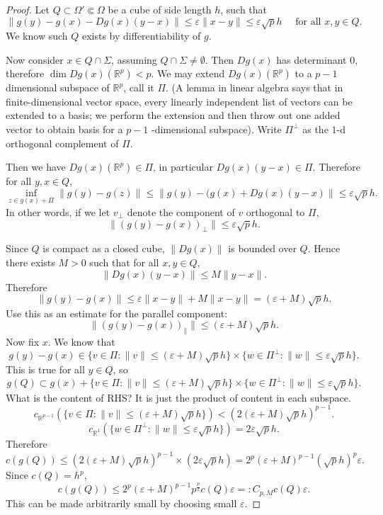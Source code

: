 \begin{proof}
	Let $Q \subset \Omega' \Subset \Omega$ be a cube of side length $h$, such that
	\[
		\|g(y) - g(x) - D g(x) (y - x)\| \le  \varepsilon \|x - y\| \le \varepsilon \sqrt{p}  h \quad \text{ for all } x, y \in Q
	.\]
	We know such $Q $ exists by differentiability of $g$.

	Now consider $x \in Q \cap \Sigma$, assuming $Q \cap \Sigma \neq \emptyset $. Then $Dg\left( x \right) $ has determinant $0$, therefore $\operatorname{dim} Dg(x)(\mathbb{R}^p) < p$. We may extend $Dg(x) (\mathbb{R}^p)$ to a $p - 1$ dimensional subspace of $\mathbb{R}^p$, call it $\Pi$. (A lemma in linear algebra says that in finite-dimensional vector space, every linearly independent list of vectors can be extended to a basis; we perform the extension and then throw out one added vector to obtain basis for a $p-1$ -dimensional subspace). Write $\Pi^\perp$ as the $1$-d orthogonal complement of $\Pi$.
	
	Then we have $Dg(x) (\mathbb{R}^p) \in \Pi$, in particular $Dg(x) (y - x) \in \Pi$. Therefore for all $y,x \in Q$,
	\[
		\inf_{z \in g(x) + \Pi}\|g(y) - g(z) \|
		\le \|g(y) - (g(x) + Dg(x) (y-x)\|
		\le \varepsilon \sqrt{p}  h
	.\] 
	In other words, if we let $v_\perp$ denote the component of $v$ orthogonal to $\Pi$,
	\[
	\|(g(y) - g(x))_\perp\| \le  \varepsilon \sqrt{p}  h
	.\] 

	Since $Q$ is compact as a closed cube, $\|Dg(x)\|$ is bounded over $Q$. Hence there exists $M>0$ such that for all $x, y \in Q$, 
	\[
		\|Dg(x)(y-x)\|\le M \| y - x\|
	.\] 
	Therefore
	\[
		\|g(y) - g(x)\| \le \varepsilon \| x - y\| + M \| x - y\| = (\varepsilon + M) \sqrt{p}  h
	.\] 
	Use this as an estimate for the parallel component:
	\[
		\|\left( g(y) - g(x) \right) _{\parallel}\|\le (\varepsilon + M) \sqrt{p}  h
	.\] 
	Now fix $x$. We know that
	\[
		g(y) - g(x) \in \{v \in \Pi: \|v\|\le (\varepsilon+M) \sqrt{p} h\} \times \{w \in \Pi^{\perp}: \| w  \| \le  \varepsilon \sqrt{p}  h\}  
	.\] 
	This is true for all $y \in Q$, so
	\[
		g(Q) \subset g(x) +  \{v \in \Pi: \|v\|\le (\varepsilon+M) \sqrt{p} h\} \times \{w \in \Pi^{\perp}: \| w  \| \le  \varepsilon \sqrt{p}  h\}
	.\] 
	What is the content of RHS? It is just the product of content in each subspace. 
	\[
		c_{\mathbb{R}^{p-1}} \left( \{v \in \Pi: \|v\| \le  (\varepsilon + M) \sqrt{p}  h\}  \right)  < (2 (\varepsilon + M) \sqrt{p} h)^{p - 1} 
	.\] 
	\[
		c_{\mathbb{R}^1} \left( \{w \in \Pi^{\perp}: \|w \|\le \varepsilon \sqrt{p}  h \}  \right) =  2 \varepsilon \sqrt{p}  h 
	.\] 
	Therefore
	\[
		c(g(Q)) \le (2 (\varepsilon + M) \sqrt{p} h)^{p - 1} \times \left( 2 \varepsilon \sqrt{p}  h \right) = 2^p (\varepsilon + M)^{p - 1} (\sqrt{ p}  h)^p \varepsilon
	.\] 
	Since $c(Q) = h^{p}$,
	\[
		c(g(Q)) \le 2^p (\varepsilon + M)^{p - 1} p^{\frac{p}{2}} c(Q) \varepsilon =: C_{p, M} c(Q) \varepsilon
	.\] 
	This can be made arbitrarily small by choosing small $\varepsilon$.



\end{proof}
